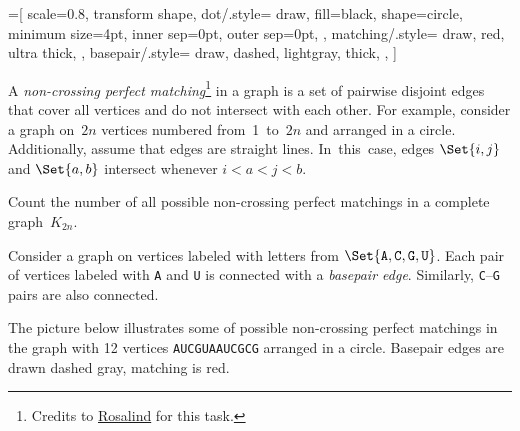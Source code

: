 \documentclass[a4paper,12pt]{article}
\begin{document}
\begin{tasks}[align=right,left=0pt]
    \begingroup
    =[
        scale=0.8, transform shape,
        dot/.style={
            draw,
            fill=black,
            shape=circle,
            minimum size=4pt,
            inner sep=0pt,
            outer sep=0pt,
        },
        matching/.style={
            draw,
            red,
            ultra thick,
        },
        basepair/.style={
            draw,
            dashed,
            lightgray,
            thick,
        },
    ]

    \newcommand{\drawRNA}{%
        \def\myRadNode{1.6}
        \def\myRadLabel{2.0}


        \foreach [count=\i, evaluate=\x as \a using {105-\i*30}] \x in {A,U,C,G,U,A,A,U,C,G,C,G}
        {
            \node[dot] (v\i) at (\a:\myRadNode) {};
            \node at (\a:\myRadLabel) {\x};
        }
    }

    \item A \emph{non-crossing perfect matching}\footnote{Credits to \href{https://rosalind.info/about}{Rosalind} for this task.} in a graph is a set of pairwise disjoint edges that cover all vertices and do not intersect with each other.
    For example, consider a graph on~$2n$ vertices numbered from~1~to~$2n$ and arranged in a circle.
    Additionally, assume that edges are straight lines.
    In~this~case, edges $\Set{i,j}$ and $\Set{a,b}$ intersect whenever $i < a < j < b$.

    \begin{subtasks}
        \item Count the number of all possible non-crossing perfect matchings in a complete graph~$K_{2n}$.

        \item Consider a graph on vertices labeled with letters from $\Set{\texttt{A}, \texttt{C}, \texttt{G}, \texttt{U}}$.
        Each pair of vertices labeled with \texttt{A} and \texttt{U} is connected with a \emph{basepair edge}.
        Similarly, \texttt{C}--\texttt{G} pairs are also connected.

        The picture below illustrates some of possible non-crossing perfect matchings in the graph with 12 vertices \texttt{AUCGUAAUCGCG} arranged in a circle.
        Basepair edges are drawn dashed gray, matching is red.


\end{subtasks}
\end{tasks}
\end{document}
